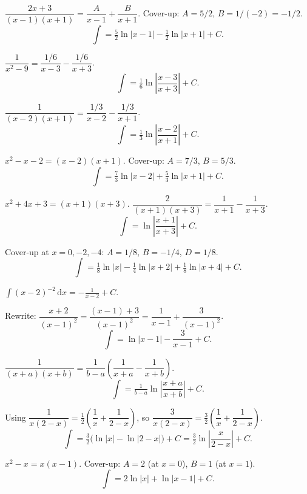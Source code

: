 \begin{solutions}
  \item $\dfrac{2x+3}{(x-1)(x+1)}=\dfrac{A}{x-1}+\dfrac{B}{x+1}$.
        Cover-up: $A=5/2$, $B=1/(-2)=-1/2$.
        \[
          \int = \tfrac52\ln|x-1|-\tfrac12\ln|x+1|+C .
        \]

  \item $\dfrac{1}{x^{2}-9}=\dfrac{1/6}{x-3}-\dfrac{1/6}{x+3}$.
        \[
          \int = \tfrac16\ln\left|\frac{x-3}{x+3}\right|+C .
        \]

  \item $\dfrac{1}{(x-2)(x+1)}=\dfrac{1/3}{x-2}-\dfrac{1/3}{x+1}$.
        \[
          \int = \tfrac13\ln\left|\frac{x-2}{x+1}\right|+C .
        \]

  \item $x^{2}-x-2=(x-2)(x+1)$. Cover-up: $A=7/3$, $B=5/3$.
        \[
          \int = \tfrac73\ln|x-2|+\tfrac53\ln|x+1|+C .
        \]

  \item $x^{2}+4x+3=(x+1)(x+3)$.
        $\dfrac{2}{(x+1)(x+3)}=\dfrac{1}{x+1}-\dfrac{1}{x+3}$.
        \[
          \int = \ln\left|\frac{x+1}{x+3}\right|+C .
        \]

  \item Cover-up at $x=0,-2,-4$: $A=1/8$, $B=-1/4$, $D=1/8$.
        \[
          \int = \tfrac18\ln|x|-\tfrac14\ln|x+2|+\tfrac18\ln|x+4|+C .
        \]

  \item $\displaystyle\int (x-2)^{-2}\,\mathrm{d}x = -\frac{1}{x-2}+C$.

  \item Rewrite: $\dfrac{x+2}{(x-1)^{2}}=\dfrac{(x-1)+3}{(x-1)^{2}}
        =\dfrac{1}{x-1}+\dfrac{3}{(x-1)^{2}}$.
        \[
          \int = \ln|x-1|-\frac{3}{x-1}+C .
        \]

  \item $\dfrac{1}{(x+a)(x+b)}=\dfrac{1}{b-a}
        \left(\dfrac{1}{x+a}-\dfrac{1}{x+b}\right)$.
        \[
          \int = \tfrac{1}{b-a}\ln\left|\frac{x+a}{x+b}\right|+C .
        \]

  \item Using $\dfrac{1}{x(2-x)}=\tfrac12\left(\dfrac1x+\dfrac{1}{2-x}\right)$,
        so $\dfrac{3}{x(2-x)}=\tfrac32\left(\dfrac1x+\dfrac{1}{2-x}\right)$.
        \[
          \int = \tfrac32\bigl(\ln|x|-\ln|2-x|\bigr)+C
               = \tfrac32\ln\left|\frac{x}{2-x}\right|+C .
        \]

  \item $x^{2}-x=x(x-1)$. Cover-up: $A=2$ (at $x=0$), $B=1$ (at $x=1$).
        \[
          \int = 2\ln|x|+\ln|x-1|+C .
        \]


\end{solutions}
